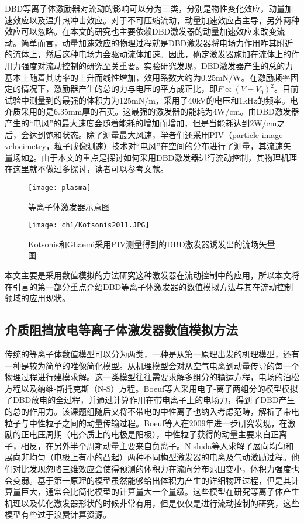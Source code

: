 DBD等离子体激励器对流动的影响可以分为三类，分别是物性变化效应，动量加速效应以及温升热冲击效应\cite{yu2017}。对于不可压缩流动，动量加速效应占主导，另外两种效应可以忽略。在本文的研究也主要依赖DBD激发器的动量加速效应来改变流动。简单而言，动量加速效应的物理过程就是DBD激发器将电场力作用咋其附近的流体上，然后这种电场力会驱动流体加速。因此，确定激发器施加在流体上的作用力强度对流动控制的研究至关重要\cite{Enloe2004,Debien2012,Kriegseis2011,Hoskinson2010,Durscher2011}。实验研究发现，DBD激发器产生的总的力基本上随着其功率的上升而线性增加，效用系数大约为0.25mN/W\cite{Kriegseis2011}。在激励频率固定的情况下，激励器产生的总的力与电压的平方成正比\cite{Debien2012}，即$F\propto(V-V_0)^2$。目前试验中测量到的最强的体积力为125mN/m\cite{Thomas2009}，采用了40kV的电压和1kHz的频率。电介质采用的是6.35mm厚的石英。这最强的激发器的能耗为4W/cm。由DBD激发器产生的“电风”的最大速度会随着能耗的增加而增加，但是当能耗达到2W/cm之后，会达到饱和状态\cite{Jolibois2009}。除了测量最大风速，学者们还采用PIV（particle image velocimetry，粒子成像测速）技术对“电风”在空间的分布进行了测量\cite{Kotsonis2011,kriegseis2013velocity}，其流速矢量场如\ref{f:Kotsonis2011}。由于本文的重点是探讨如何采用DBD激发器进行流动控制，其物理机理在这里就不做过多探讨，读者可以参考文献\cite{Moreau2007,Benard2014}。

\begin{figure}
  \centering
  \texttt{[image: plasma]}
  \caption{等离子体激发器示意图\cite{Whalley2012}}\label{fig:SchematicPlasma}
\end{figure}
\begin{figure}
  \centering
  \texttt{[image: ch1/Kotsonis2011.JPG]}
  \caption{Kotsonis和Ghaemi\cite{Kotsonis2011}采用PIV测量得到的DBD激发器诱发出的流场矢量图}\label{f:Kotsonis2011}
\end{figure}
本文主要是采用数值模拟的方法研究这种激发器在流动控制中的应用，所以本文将在引言的第一部分重点介绍DBD等离子体激发器的数值模拟方法与其在流动控制领域的应用现状。


\subsection{介质阻挡放电等离子体激发器数值模拟方法}
传统的等离子体数值模型可以分为两类，一种是从第一原理出发的机理模型，还有一种是较为简单的唯像简化模型。从机理模型会对从空气电离到动量传导的每一个物理过程进行建模求解。这一类模型往往需要求解多组分的输运方程，电场的泊松方程以及纳维-斯托克斯（N-S）方程。Boeuf等人\cite{Boeuf2007}采用电子-离子两组分的模型模拟了DBD放电的全过程，并通过计算作用在带电离子上的电场力，得到了DBD产生的总的作用力。该课题组随后又将不带电的中性离子也纳入考虑范畴，解析了带电粒子与中性粒子之间的动量传输过程。Boeuf等人\cite{Boeuf2009}在2009年进一步研究发现，在激励的正电压周期（电介质上的电极是阳极），中性粒子获得的动量主要来自正离子，相反，在另外半个周期动量主要来自负离子。Nishida等人\cite{Nishida2016,Nishida2011}求解了展向均匀和展向非均匀（电极上有小的凸起）两种不同构型激发器的电离及气动激励过程。他们对比发现忽略三维效应会使得预测的体积力在流向分布范围变小，体积力强度也会变弱。基于第一原理的模型虽然能够给出体积力产生的详细物理过程，但是其计算量巨大，通常会比简化模型的计算量大一个量级。这些模型在研究等离子体产生机理以及优化激发器形状的时候非常有用，但是仅仅是进行流动控制的研究，这些模型有些过于浪费计算资源。


